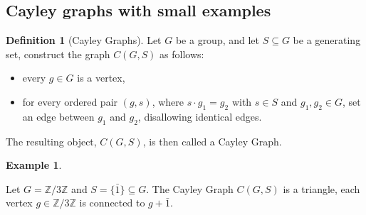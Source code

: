 \documentclass[a4paper,10pt]{article}
\numberwithin{equation}{section}
\theoremstyle{definition}
\newtheorem{definition}[theorem]{Definition}
\newtheorem*{example}{Example}
\begin{document}
\subsection{Cayley graphs with small examples}
    \begin{definition}[Cayley Graphs]\label{cayley}
        Let \(G\) be a group, and let \(S\subseteq G\) be a generating set, construct the graph \(C(G,S)\) as follows:
        \begin{itemize}
            \item every \(g\in G\) is a vertex,
            \item for every ordered pair \((g, s)\), where \(s\cdot g_1 = g_2\) with \(s\in S\) and \(g_1, g_2\in G\), set an edge between \(g_1\) and \(g_2\), disallowing identical edges.
        \end{itemize}
        The resulting object, \(C(G,S)\), is then called a Cayley Graph.
    \end{definition}
    \begin{example}
        \leavevmode\par
        \begin{center}
        \end{center}
        Let \(G =\mathbb{Z}/3\mathbb{Z}\) and \(S =\{\bar{1}
        \}\subseteq G\). The Cayley Graph \(C(G, S)\) is a triangle, each vertex \(g\in \mathbb{Z}/3\mathbb{Z}\) is connected to \(g + \bar{1}\).
    \end{example}
\end{document}
